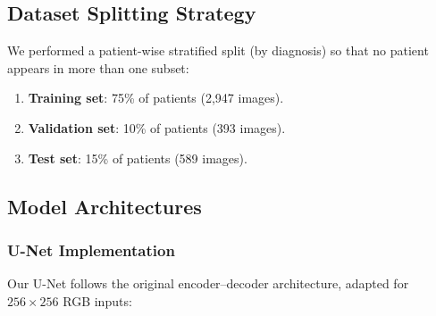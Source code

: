 \documentclass[a4paper, journal]{IEEEtran}
\begin{document}
\subsection{Dataset Splitting Strategy}
We performed a patient-wise stratified split (by diagnosis) so that no patient appears in more than one subset:
\begin{enumerate}
    \item \textbf{Training set}: 75\% of patients (2,947 images).
    \item \textbf{Validation set}: 10\% of patients (393 images).
    \item \textbf{Test set}: 15\% of patients (589 images).
\end{enumerate}


\subsection{Model Architectures}

\subsubsection{U-Net Implementation}
Our U-Net follows the original encoder–decoder architecture, adapted for $256\times256$ RGB inputs:
\end{document}
